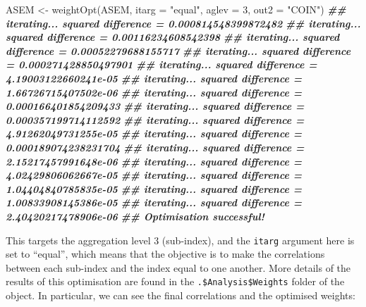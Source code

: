 \documentclass[
]{book}
\newenvironment{Shaded}{\begin{snugshade}}{\end{snugshade}}
\newcommand{\AttributeTok}[1]{\textcolor[rgb]{0.77,0.63,0.00}{#1}}
\newcommand{\DecValTok}[1]{\textcolor[rgb]{0.00,0.00,0.81}{#1}}
\newcommand{\DocumentationTok}[1]{\textcolor[rgb]{0.56,0.35,0.01}{\textbf{\textit{#1}}}}
\newcommand{\FunctionTok}[1]{\textcolor[rgb]{0.00,0.00,0.00}{#1}}
\newcommand{\NormalTok}[1]{#1}
\newcommand{\OtherTok}[1]{\textcolor[rgb]{0.56,0.35,0.01}{#1}}
\newcommand{\SpecialCharTok}[1]{\textcolor[rgb]{0.00,0.00,0.00}{#1}}
\newcommand{\StringTok}[1]{\textcolor[rgb]{0.31,0.60,0.02}{#1}}
\begin{document}
\begin{Shaded}
\begin{Highlighting}[]

\NormalTok{ASEM }\OtherTok{\textless{}{-}} \FunctionTok{weightOpt}\NormalTok{(ASEM, }\AttributeTok{itarg =} \StringTok{"equal"}\NormalTok{, }\AttributeTok{aglev =} \DecValTok{3}\NormalTok{, }\AttributeTok{out2 =} \StringTok{"COIN"}\NormalTok{)}
\DocumentationTok{\#\# iterating... squared difference = 0.000814548399872482}
\DocumentationTok{\#\# iterating... squared difference = 0.00116234608542398}
\DocumentationTok{\#\# iterating... squared difference = 0.00052279688155717}
\DocumentationTok{\#\# iterating... squared difference = 0.000271428850497901}
\DocumentationTok{\#\# iterating... squared difference = 4.19003122660241e{-}05}
\DocumentationTok{\#\# iterating... squared difference = 1.66726715407502e{-}06}
\DocumentationTok{\#\# iterating... squared difference = 0.000166401854209433}
\DocumentationTok{\#\# iterating... squared difference = 0.000357199714112592}
\DocumentationTok{\#\# iterating... squared difference = 4.91262049731255e{-}05}
\DocumentationTok{\#\# iterating... squared difference = 0.000189074238231704}
\DocumentationTok{\#\# iterating... squared difference = 2.15217457991648e{-}06}
\DocumentationTok{\#\# iterating... squared difference = 4.02429806062667e{-}05}
\DocumentationTok{\#\# iterating... squared difference = 1.04404840785835e{-}05}
\DocumentationTok{\#\# iterating... squared difference = 1.00833908145386e{-}05}
\DocumentationTok{\#\# iterating... squared difference = 2.40420217478906e{-}06}
\DocumentationTok{\#\# Optimisation successful!}
\end{Highlighting}
\end{Shaded}

This targets the aggregation level 3 (sub-index), and the \texttt{itarg} argument here is set to ``equal'', which means that the objective is to make the correlations between each sub-index and the index equal to one another. More details of the results of this optimisation are found in the \texttt{.\$Analysis\$Weights} folder of the object. In particular, we can see the final correlations and the optimised weights:

\begin{Shaded}
\end{Shaded}
\end{document}
